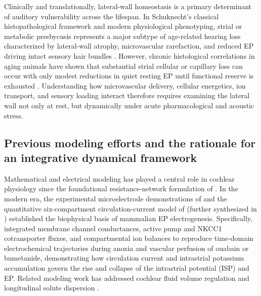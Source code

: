 \documentclass[final,5p,times]{elsarticle}
\begin{document}
Clinically and translationally, lateral-wall homeostasis is a primary determinant of auditory vulnerability across the lifespan. In Schuknecht's classical histopathological framework and modern physiological phenotyping, strial or metabolic presbycusis represents a major subtype of age-related hearing loss characterized by lateral-wall atrophy, microvascular rarefaction, and reduced EP driving intact sensory hair bundles \citep{Schuknecht1974,Ohlemiller2006,Ohlemiller2009,Vaden2022}. However, chronic histological correlations in aging animals have shown that substantial strial cellular or capillary loss can occur with only modest reductions in quiet resting EP until functional reserve is exhausted \citep{Ohlemiller2006,Ohlemiller2009}. Understanding how microvascular delivery, cellular energetics, ion transport, and sensory loading interact therefore requires examining the lateral wall not only at rest, but dynamically under acute pharmacological and acoustic stress.

\subsection{Previous modeling efforts and the rationale for an integrative dynamical framework}\label{sec:intro-prior-models}

Mathematical and electrical modeling has played a central role in cochlear physiology since the foundational resistance-network formulation of \citet{Davis1958}. In the modern era, the experimental microelectrode demonstrations of \citet{Nin2008} and the quantitative six-compartment circulation-current model of \citet{Nin2012} (further synthesized in \citealt{NinHibino2016}) established the biophysical basis of mammalian EP electrogenesis. Specifically, \citet{Nin2012} integrated membrane channel conductances, active pump and NKCC1 cotransporter fluxes, and compartmental ion balances to reproduce time-domain electrochemical trajectories during anoxia and vascular perfusion of ouabain or bumetanide, demonstrating how circulation current and intrastrial potassium accumulation govern the rise and collapse of the intrastrial potential (ISP) and EP. Related modeling work has addressed cochlear fluid volume regulation and longitudinal solute dispersion \citep{Salt2001}.
\end{document}

